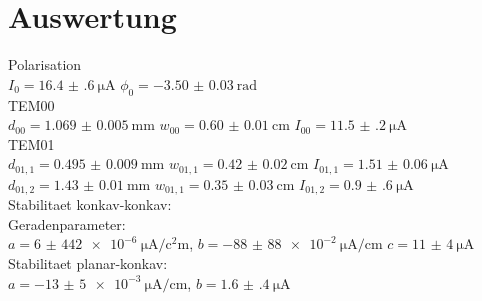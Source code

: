 \section{Auswertung}
\label{sec:Auswertung}
Polarisation\\
$I_0=\SI{16.4(6)}{\micro\ampere}$ $\phi_0=\SI{-3.50(3)}{\radian}$\\
TEM00\\
$d_{00}=\SI{1.069(5)}{\milli\meter}$ $w_{00}=\SI{0.60(1)}{\centi\meter}$ $I_{00}=\SI{11.5(2)}{\micro\ampere}$\\
TEM01\\
$d_{01,1}=\SI{0.495(9)}{\milli\meter}$ $w_{01,1}=\SI{0.42(2)}{\centi\meter}$ $I_{01,1}=\SI{1.51(6)}{\micro\ampere}$\\
$d_{01,2}=\SI{1.43(1)}{\milli\meter}$ $w_{01,1}=\SI{0.35(3)}{\centi\meter}$ $I_{01,2}=\SI{0.9(6)}{\micro\ampere}$\\

Stabilitaet konkav-konkav:\\
Geradenparameter:\\
$a=\SI{6(442)e-6}{\micro\ampere\per\square\centi\meter}$, $b=-\SI{88(88)e-2}{\micro\ampere\per\centi\meter}$ $c=\SI{11(4)}{\micro\ampere}$\\
Stabilitaet planar-konkav:\\
$a=-\SI{13(5)e-3}{\micro\ampere\per\centi\meter}$, $b=\SI{1.6(4)}{\micro\ampere}$\\

